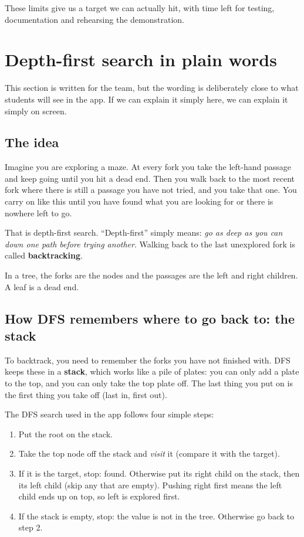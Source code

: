 \documentclass[11pt,a4paper]{article}
\begin{document}
These limits give us a target we can actually hit, with time left for testing, documentation and
rehearsing the demonstration.

\section{Depth-first search in plain words}
\label{sec:dfs}

This section is written for the team, but the wording is deliberately close to what students
will see in the app. If we can explain it simply here, we can explain it simply on screen.

\subsection{The idea}

Imagine you are exploring a maze. At every fork you take the left-hand passage and keep going
until you hit a dead end. Then you walk back to the most recent fork where there is still a
passage you have not tried, and you take that one. You carry on like this until you have found
what you are looking for or there is nowhere left to go.

That is depth-first search. ``Depth-first'' simply means: \emph{go as deep as you can down one
path before trying another}. Walking back to the last unexplored fork is called
\textbf{backtracking}.

In a tree, the forks are the nodes and the passages are the left and right children. A leaf is
a dead end.

\subsection{How DFS remembers where to go back to: the stack}

To backtrack, you need to remember the forks you have not finished with. DFS keeps these in a
\textbf{stack}, which works like a pile of plates: you can only add a plate to the top, and you can
only take the top plate off. The last thing you put on is the first thing you take off
(last in, first out).

The DFS search used in the app follows four simple steps:

\begin{enumerate}
  \item Put the root on the stack.
  \item Take the top node off the stack and \emph{visit} it (compare it with the target).
  \item If it is the target, stop: found. Otherwise put its right child on the stack, then its
        left child (skip any that are empty). Pushing right first means the left child ends up
        on top, so left is explored first.
  \item If the stack is empty, stop: the value is not in the tree. Otherwise go back to step 2.
\end{enumerate}
\end{document}
